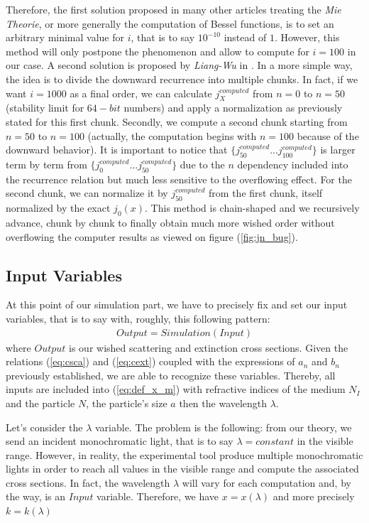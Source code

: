 \documentclass{article}
\numberwithin{equation}{section}
\begin{document}
Therefore, the first solution proposed in many other articles treating the \textit{Mie Theorie}, or more generally the computation of Bessel functions, is to set an arbitrary minimal value for $i$, that is to say $10^{-10}$ instead of $1$. However, this method will only postpone the phenomenon and allow to compute for $i=100$ in our case. A second solution is proposed by \textit{Liang-Wu} in \cite{liangwu}. In a more simple way, the idea is to divide the downward recurrence into multiple chunks. In fact, if we want $i=1000$ as a final order, we can calculate $j^{computed}_{X}$ from $n=0$ to $n=50$ (stability limit for $64-bit$ numbers) and apply a normalization as previously stated for this first chunk. Secondly, we compute a second chunk starting from $n=50$ to $n=100$ (actually, the computation begins with $n=100$ because of the downward behavior). It is important to notice that $\{j^{computed}_{50}...j^{computed}_{100}\}$ is larger term by term from $\{j^{computed}_{0}...j^{computed}_{50}\}$ due to the $n$ dependency included into the recurrence relation but much less sensitive to the overflowing effect. For the second chunk, we can normalize it by $j^{computed}_{50}$ from the first chunk, itself normalized by the exact $j_{0}(x)$. This method is chain-shaped and we recursively advance, chunk by chunk to finally obtain much more wished order without overflowing the computer results as viewed on figure (\ref{fig:jn_bug}).

\subsection{Input Variables}

At this point of our simulation part, we have to precisely fix and set our input variables, that is to say with, roughly, this following pattern:
\begin{align}
Output = Simulation(Input)
\end{align}
where $Output$ is our wished scattering and extinction cross sections. Given the relations (\ref{eq:csca}) and (\ref{eq:cext}) coupled with the expressions of $a_{n}$ and $b_{n}$ previously established, we are able to recognize these variables. Thereby, all inputs are included into (\ref{eq:def_x_m}) with refractive indices of the medium $N_{I}$ and the particle $N$, the particle's size $a$ then the wavelength $\lambda$.

Let's consider the $\lambda$ variable. The problem is the following: from our theory, we send an incident monochromatic light, that is to say $\lambda=constant$ in the visible range. However, in reality, the experimental tool produce multiple monochromatic lights in order to reach all values in the visible range and compute the associated cross sections. In fact, the wavelength $\lambda$ will vary for each computation and, by the way, is an $Input$ variable. Therefore, we have $x=x(\lambda)$ and more precisely $k=k(\lambda)$
\end{document}
